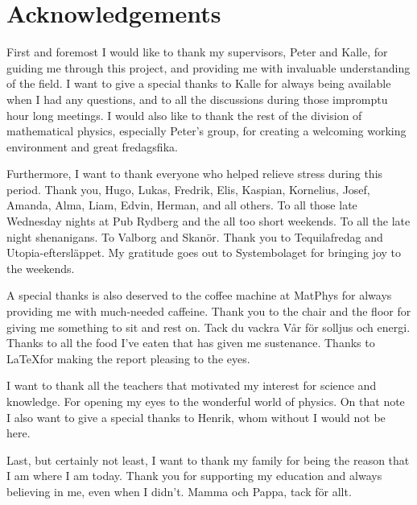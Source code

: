 \section*{Acknowledgements}
First and foremost I would like to thank my supervisors, Peter and Kalle, for guiding me through this project, and providing me with invaluable understanding of the field. I want to give a special thanks to Kalle for always being available when I had any questions, and to all the discussions during those impromptu hour long meetings. I would also like to thank the rest of the division of mathematical physics, especially Peter's group, for creating a welcoming working environment and great fredagsfika.

Furthermore, I want to thank everyone who helped relieve stress during this period. Thank you, Hugo, Lukas, Fredrik, Elis, Kaspian, Kornelius, Josef, Amanda, Alma, Liam, Edvin, Herman, and all others. To all those late Wednesday nights at Pub Rydberg and the all too short weekends. To all the late night shenanigans. To Valborg and Skanör. Thank you to Tequilafredag and Utopia-eftersläppet. My gratitude goes out to Systembolaget for bringing joy to the weekends.

A special thanks is also deserved to the coffee machine at MatPhys for always providing me with much-needed caffeine. Thank you to the chair and the floor for giving me something to sit and rest on. Tack du vackra Vår för solljus och energi. Thanks to all the food I've eaten that has given me sustenance. Thanks to \LaTeX for making the report pleasing to the eyes. 

I want to thank all the teachers that motivated my interest for science and knowledge. For opening my eyes to the wonderful world of physics. On that note I also want to give a special thanks to Henrik, whom without I would not be here. 

Last, but certainly not least, I want to thank my family for being the reason that I am where I am today. Thank you for supporting my education and always believing in me, even when I didn't. Mamma och Pappa, tack för allt.